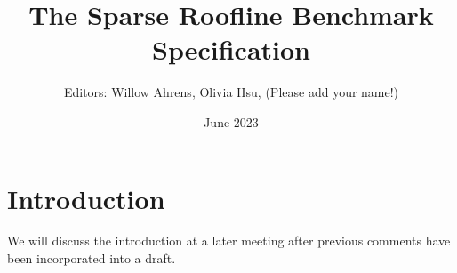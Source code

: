 \documentclass{article}
\title{The Sparse Roofline Benchmark Specification}
\author{Editors: Willow Ahrens, Olivia Hsu, (Please add your name!)}
\date{June 2023}
\begin{document}
\maketitle

\section{Introduction}

We will discuss the introduction at a later meeting after previous comments have been incorporated into a draft.





\end{document}

